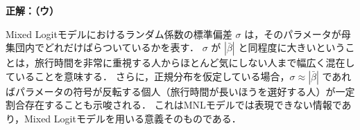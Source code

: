\begin{example}[title={クイズ 3 正解・解説}]
\label{ans:ch2-q3}
\textbf{正解：（ウ）}

Mixed Logitモデルにおけるランダム係数の標準偏差 $\sigma$ は，そのパラメータが母集団内でどれだけばらついているかを表す．
$\sigma$ が $|\bar{\beta}|$ と同程度に大きいということは，旅行時間を非常に重視する人からほとんど気にしない人まで幅広く混在していることを意味する．
さらに，正規分布を仮定している場合，$\sigma \approx |\bar{\beta}|$ であればパラメータの符号が反転する個人（旅行時間が長いほうを選好する人）が一定割合存在することも示唆される．
これはMNLモデルでは表現できない情報であり，Mixed Logitモデルを用いる意義そのものである．
\end{example}


